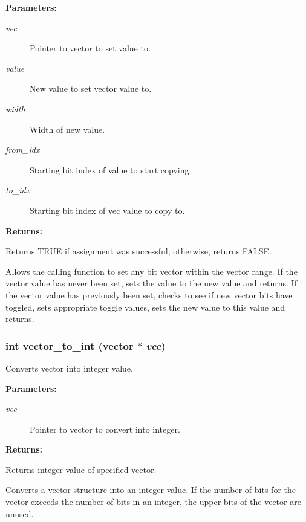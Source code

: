 \begin{Desc}
\item[{\bf Parameters: }]\par
\begin{description}
\item[
{\em vec}]Pointer to vector to set value to. \item[
{\em value}]New value to set vector value to. \item[
{\em width}]Width of new value. \item[
{\em from\_\-idx}]Starting bit index of value to start copying. \item[
{\em to\_\-idx}]Starting bit index of vec value to copy to. \end{description}
\end{Desc}
\begin{Desc}
\item[{\bf Returns: }]\par
Returns TRUE if assignment was successful; otherwise, returns FALSE.

\end{Desc}
Allows the calling function to set any bit vector within the vector range. If the vector value has never been set, sets the value to the new value and returns. If the vector value has previously been set, checks to see if new vector bits have toggled, sets appropriate toggle values, sets the new value to this value and returns. 
\subsubsection{\setlength{\rightskip}{0pt plus 5cm}int vector\_\-to\_\-int ({\bf vector} $\ast$ {\em vec})}\label{vector_8h_a15}


Converts vector into integer value.

\begin{Desc}
\item[{\bf Parameters: }]\par
\begin{description}
\item[
{\em vec}]Pointer to vector to convert into integer.

\end{description}
\end{Desc}
\begin{Desc}
\item[{\bf Returns: }]\par
Returns integer value of specified vector.

\end{Desc}
Converts a vector structure into an integer value. If the number of bits for the vector exceeds the number of bits in an integer, the upper bits of the vector are unused. 
